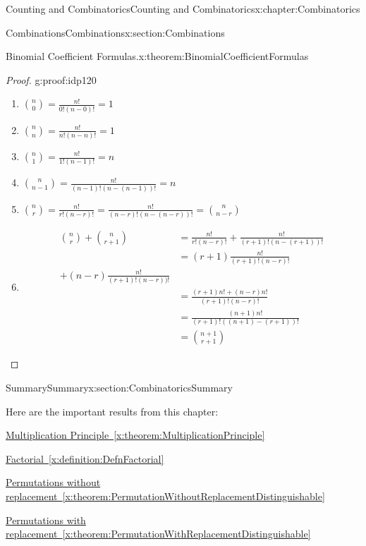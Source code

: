 \documentclass[oneside,10pt,]{book}
\newcommand{\xreffont}{\relax}
\numberwithin{equation}{section}
\begin{document}
\begin{chapterptx}{Counting and Combinatorics}{}{Counting and Combinatorics}{}{}{x:chapter:Combinatorics}
\begin{sectionptx}{Combinations}{}{Combinations}{}{}{x:section:Combinations}
\begin{theorem}{Binomial Coefficient Formulas.}{}{x:theorem:BinomialCoefficientFormulas}
\begin{enumerate}
\end{enumerate}
%
\end{theorem}
\begin{proof}{}{g:proof:idp120}
%
\begin{enumerate}
\item{}\(\displaystyle \binom{n}{0} = \frac{n!}{0!(n-0)!} = 1\)%
\item{}\(\displaystyle \binom{n}{n} = \frac{n!}{n!(n-n)!} = 1\)%
\item{}\(\displaystyle \binom{n}{1} = \frac{n!}{1!(n-1)!} = n\)%
\item{}\(\displaystyle \binom{n}{n-1} = \frac{n!}{(n-1)!(n-(n-1))!} = n\)%
\item{}\(\displaystyle \binom{n}{r} = \frac{n!}{r!(n-r)!} = \frac{n!}{(n-r)!(n-(n-r))!} = \binom{n}{n-r}\)%
\item{}%
\begin{align*}
\binom{n}{r} + \binom{n}{r+1} & = \frac{n!}{r!(n-r)!} + \frac{n!}{(r+1)!(n-(r+1))!}\\
& = (r+1) \frac{n!}{(r+1)!(n-r)!} \\ + (n-r) \frac{n!}{(r+1)!(n-r))!}\\
& = \frac{(r+1) n! + (n-r)n!}{(r+1)!(n-r)!}\\
& = \frac{(n+1) n!}{(r+1)!((n+1)-(r+1))!}\\
& = \binom{n+1}{r+1}
\end{align*}
%
\end{enumerate}
%
\end{proof}
\end{sectionptx}
%
%
\typeout{************************************************}
\typeout{************************************************}
%
\begin{sectionptx}{Summary}{}{Summary}{}{}{x:section:CombinatoricsSummary}
\begin{introduction}{}%
Here are the important results from this chapter:%
\end{introduction}%
\hyperref[x:theorem:MultiplicationPrinciple]{Multiplication Principle~{\xreffont\ref{x:theorem:MultiplicationPrinciple}}}%
\par
\hyperref[x:definition:DefnFactorial]{Factorial~{\xreffont\ref{x:definition:DefnFactorial}}}%
\par
\hyperref[x:theorem:PermutationWithoutReplacementDistinguishable]{Permutations without replacement~{\xreffont\ref{x:theorem:PermutationWithoutReplacementDistinguishable}}}%
\par
\hyperref[x:theorem:PermutationWithReplacementDistinguishable]{Permutations with replacement~{\xreffont\ref{x:theorem:PermutationWithReplacementDistinguishable}}}%

\end{sectionptx}
\end{chapterptx}
\end{document}
